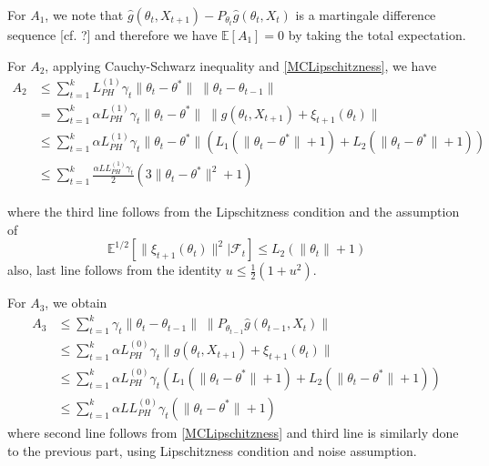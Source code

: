 \documentclass[a4paper]{article}
\newcommand{\norm}[1]{\|#1 \|}
\newcommand{\Exs}{\mathbb{E}}
\newcommand{\thetastar}{\theta^*}
\newcommand{\constLPH}[1]{L_{PH}^{(#1)}}
\newcommand{\stepsize}{\alpha}
\begin{document}
	For $A_{1}$, we note that $\hat{g}\left(\theta_{t}, X_{t + 1}\right) - P_{\theta_{t}}\hat{g}\left(\theta_{t}, X_{t}\right)$ is a martingale difference sequence [cf. ?] and therefore we have $\Exs[A_{1}] = 0$ by taking the total expectation.
	
	For $A_{2}$, applying Cauchy-Schwarz inequality and \ref{MCLipschitzness}, we have
	\begin{align*}
		A_{2} & \le \sum_{t = 1}^{k}\constLPH{1}\gamma_{t}\norm{\theta_{t} - \thetastar}\;\norm{\theta_{t} - \theta_{t - 1}}\\
		& = \sum_{t = 1}^{k}\stepsize \constLPH{1}\gamma_{t}\norm{\theta_{t} - \thetastar}\;\norm{g(\theta_{t}, X_{t + 1}) + \xi_{t +‌1}(\theta_{t})}\\
		& \le \sum_{t = 1}^{k}\stepsize \constLPH{1} \gamma_{t}\norm{\theta_{t} - \thetastar}\left( L_{1}\left(\norm{\theta_{t} - \thetastar} + 1\right) + L_{2}\left(\norm{\theta_{t} - \thetastar} + 1\right)\right)\\
		& \le \sum_{t = 1}^{k}\frac{\stepsize L \constLPH{1}\gamma_{t}}{2}\left(3\norm{\theta_{t} - \thetastar}^{2} + 1\right)
	\end{align*}
	
	
	
	
	where the third line follows from the Lipschitzness condition and the assumption of
	$$\Exs^{1 / 2}\left[\norm{\xi_{t + 1}\left(\theta_{t}\right)}^{2} | \mathcal{F}_{t}\right] \le L_{2}\left(\norm{\theta_{t}} + 1\right)$$
	also, last line follows from the identity $u \le \frac{1}{2}(1 + u^{2})$.
	
	For $A_{3}$, we obtain
	\begin{align*}
		A_{3} & \le \sum_{t = 1}^{k}\gamma_{t}\norm{\theta_{t} - \theta_{t - 1}} \; \norm{P_{\theta_{t - 1}}\hat{g}\left(\theta_{t - 1}, X_{t}\right)}\\
		& \le \sum_{t = 1}^{k}\stepsize \constLPH{0}\gamma_{t}\norm{g\left(\theta_{t}, X_{t + 1}\right)‌ + \xi_{t + 1}(\theta_{t})}\\
		& \le \sum_{t = 1}^{k}\stepsize\constLPH{0}\gamma_{t}\left(L_{1}\left(\norm{\theta_{t} - \thetastar} + 1\right) + L_{2}\left(\norm{\theta_{t} - \thetastar} + 1\right)\right)\\
		& \le \sum_{t = 1}^{k}\stepsize L \constLPH{0}\gamma_{t}\left(\norm{\theta_{t} - \thetastar} + 1\right)
	\end{align*}
	where second line follows from \ref{MCLipschitzness} and third line is similarly done to the previous part, using Lipschitzness condition and noise assumption.
	
\end{document}
